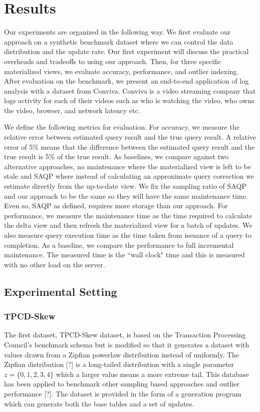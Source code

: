 \section{Results}
\label{exp}
Our experiments are organized in the following way.
We first evaluate our approach on a synthetic benchmark dataset where we can control the data distribution and the update rate.
Our first experiment will discuss the practical overheads and tradeoffs to using our approach.
Then, for three specific materialized views, we evaluate accuracy, performance, and outlier indexing.
After evaluation on the benchmark, we present an end-to-end application of log analysis with a dataset from Conviva.
Conviva is a video streaming company that logs activity for each of their videos such as who is watching the video, who owns the video, browser, and network latency etc. 

We define the following metrics for evaluation.
For accuracy, we measure the relative error between estimated query result and the true query result.
A relative error of 5\% means that the difference between the estimated query result and the true result is 5\% of the true result.
As baselines, we compare against two alternative approaches, no maintenance where the materialized view is left to be stale and SAQP where instead 
of calculating an approximate query correction we estimate directly from the up-to-date view.
We fix the sampling ratio of SAQP and our approach to be the same so they will have the same maintenance time.
Even so, SAQP as defined, requires more storage than our approach.
For performance, we measure the maintenance time as the time required to calculate the delta view and then refresh the materialized view for a batch of updates.
We also measure query execution time as the time taken from issuance of a query to completion.
As a baseline, we compare the performance to full incremental maintenance.
The measured time is the ``wall clock" time and this is measured with no other load on the server.

\subsection{Experimental Setting}
\subsubsection{TPCD-Skew}
The first dataset, TPCD-Skew dataset, is based on the Transaction Processing Council's benchmark
schema but is modified so that it generates a dataset with values drawn from a Zipfian powerlaw distribution instead of uniformly.
The Zipfian distribution [?] is a long-tailed distribution with a single parameter $z=\{0,1,2,3,4\}$ which a larger
value means a more extreme tail.
This database has been applied to benchmark other sampling based approaches and outlier performance [?].
The dataset is provided in the form of a generation program which can generate both the base tables and a set of updates.

